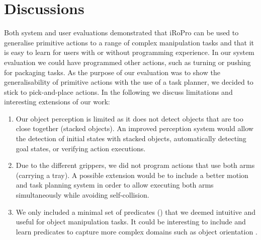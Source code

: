 \section{Discussions}
\label{sec:discussions}
Both system and user evaluations demonstrated that iRoPro can be used to generalise primitive actions to a range of complex manipulation tasks and that it is easy to learn for users with or without programming experience.
In our system evaluation we could have programmed other actions, such as turning or pushing for packaging tasks.
As the purpose of our evaluation was to show the generalisability of primitive actions with the use of a task planner, we decided to stick to pick-and-place actions.
In the following we discuss limitations and interesting extensions of our work:
\begin{enumerate}
	\item Our object perception is limited as it does not detect objects that are too close together (\eg stacked objects).
	An improved perception system would allow the detection of initial states with stacked objects, automatically detecting goal states, or verifying action executions.
	\item Due to the different grippers, we did not program actions that use both arms (\eg carrying a tray). A possible extension would be to include a better motion and task planning system in order to allow executing both arms simultaneously while avoiding self-collision.
	\item We only included a minimal set of predicates () that we deemed intuitive and useful for object manipulation tasks.
	It could be interesting to include and learn predicates to capture more complex domains such as object orientation \cite{li2016learning}.
\end{enumerate}


